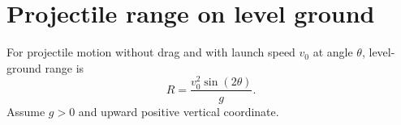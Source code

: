 %
%
%
%

\section*{Projectile range on level ground}
For projectile motion without drag and with launch speed $v_0$ at angle
$\theta$, level-ground range is
\[
  R=\frac{v_0^2\sin(2\theta)}{g}.
\]
Assume $g>0$ and upward positive vertical coordinate.
